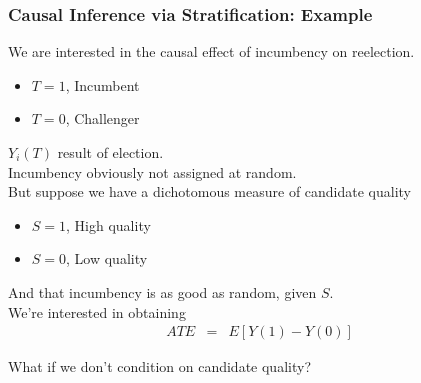 \documentclass{beamer}
\numberwithin{equation}{section}
\begin{document}
\begin{frame}
\frametitle{Causal Inference via Stratification: Example}

We are interested in the causal effect of \alert{incumbency} on reelection.  \\
\begin{itemize}
\item[-] $T=1$, Incumbent
\item[-] $T= 0$, Challenger
\end{itemize}
$Y_{i}(T)$ result of election. \\
Incumbency obviously not assigned at random.   \\
But suppose we have a dichotomous measure of candidate quality 
\begin{itemize}
\item[-] $S=1$, High quality
\item[-] $S=0$, Low quality
\end{itemize}
And that incumbency is as good as random, given $S$.  \\
We're interested in obtaining
\begin{eqnarray}
ATE & = & E[Y(1) - Y(0) ] \nonumber 
\end{eqnarray}

What if we don't condition on candidate quality?


\end{frame}
\end{document}
